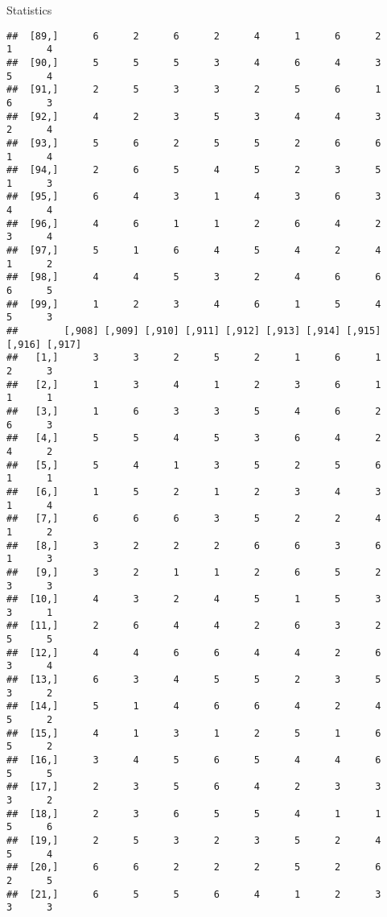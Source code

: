 \documentclass[
  ignorenonframetext,
]{beamer}
\begin{document}
\begin{frame}[fragile]{Statistics}
\begin{verbatim}
##  [89,]      6      2      6      2      4      1      6      2      1      4
##  [90,]      5      5      5      3      4      6      4      3      5      4
##  [91,]      2      5      3      3      2      5      6      1      6      3
##  [92,]      4      2      3      5      3      4      4      3      2      4
##  [93,]      5      6      2      5      5      2      6      6      1      4
##  [94,]      2      6      5      4      5      2      3      5      1      3
##  [95,]      6      4      3      1      4      3      6      3      4      4
##  [96,]      4      6      1      1      2      6      4      2      3      4
##  [97,]      5      1      6      4      5      4      2      4      1      2
##  [98,]      4      4      5      3      2      4      6      6      6      5
##  [99,]      1      2      3      4      6      1      5      4      5      3
##        [,908] [,909] [,910] [,911] [,912] [,913] [,914] [,915] [,916] [,917]
##   [1,]      3      3      2      5      2      1      6      1      2      3
##   [2,]      1      3      4      1      2      3      6      1      1      1
##   [3,]      1      6      3      3      5      4      6      2      6      3
##   [4,]      5      5      4      5      3      6      4      2      4      2
##   [5,]      5      4      1      3      5      2      5      6      1      1
##   [6,]      1      5      2      1      2      3      4      3      1      4
##   [7,]      6      6      6      3      5      2      2      4      1      2
##   [8,]      3      2      2      2      6      6      3      6      1      3
##   [9,]      3      2      1      1      2      6      5      2      3      3
##  [10,]      4      3      2      4      5      1      5      3      3      1
##  [11,]      2      6      4      4      2      6      3      2      5      5
##  [12,]      4      4      6      6      4      4      2      6      3      4
##  [13,]      6      3      4      5      5      2      3      5      3      2
##  [14,]      5      1      4      6      6      4      2      4      5      2
##  [15,]      4      1      3      1      2      5      1      6      5      2
##  [16,]      3      4      5      6      5      4      4      6      5      5
##  [17,]      2      3      5      6      4      2      3      3      3      2
##  [18,]      2      3      6      5      5      4      1      1      5      6
##  [19,]      2      5      3      2      3      5      2      4      5      4
##  [20,]      6      6      2      2      2      5      2      6      2      5
##  [21,]      6      5      5      6      4      1      2      3      3      3

\end{verbatim}
\end{frame}
\end{document}
